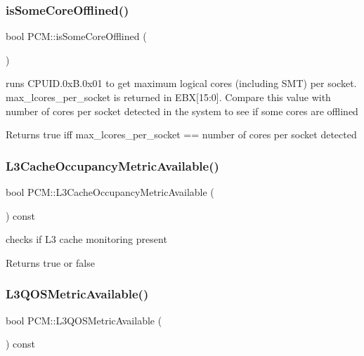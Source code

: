 \subsubsection{\texorpdfstring{is\+Some\+Core\+Offlined()}{isSomeCoreOfflined()}}
{\footnotesize\ttfamily bool P\+C\+M\+::is\+Some\+Core\+Offlined (\begin{DoxyParamCaption}{ }\end{DoxyParamCaption})}



runs C\+P\+U\+I\+D.\+0x\+B.\+0x01 to get maximum logical cores (including S\+MT) per socket. max\+\_\+lcores\+\_\+per\+\_\+socket is returned in E\+BX\mbox{[}15\+:0\mbox{]}. Compare this value with number of cores per socket detected in the system to see if some cores are offlined 

\begin{DoxyReturn}{Returns}
true iff max\+\_\+lcores\+\_\+per\+\_\+socket == number of cores per socket detected 
\end{DoxyReturn}
\mbox{\label{class_p_c_m_a6a6580b296a5a0236c9e00956988c0fc}} 
\subsubsection{\texorpdfstring{L3\+Cache\+Occupancy\+Metric\+Available()}{L3CacheOccupancyMetricAvailable()}}
{\footnotesize\ttfamily bool P\+C\+M\+::\+L3\+Cache\+Occupancy\+Metric\+Available (\begin{DoxyParamCaption}{ }\end{DoxyParamCaption}) const}



checks if L3 cache monitoring present 

\begin{DoxyReturn}{Returns}
true or false 
\end{DoxyReturn}
\mbox{\label{class_p_c_m_ab1be879d2c871816ddbcfa30bb58a3e7}} 
\subsubsection{\texorpdfstring{L3\+Q\+O\+S\+Metric\+Available()}{L3QOSMetricAvailable()}}
{\footnotesize\ttfamily bool P\+C\+M\+::\+L3\+Q\+O\+S\+Metric\+Available (\begin{DoxyParamCaption}{ }\end{DoxyParamCaption}) const}



